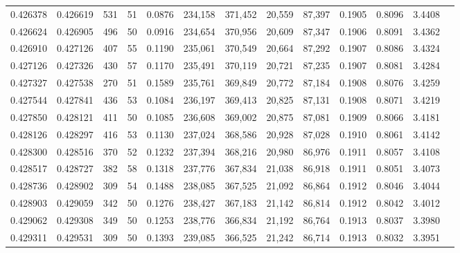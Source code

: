 \begin{tabular}{rrrrrrrrrrrrr}
0.426378 & 0.426619 &   531 &  51 &                                     0.0876 & 234,158 & 371,452 &  20,559 &  87,397 & 0.1905 & 0.8096 & 3.4408 \\
0.426624 & 0.426905 &   496 &  50 &                                     0.0916 & 234,654 & 370,956 &  20,609 &  87,347 & 0.1906 & 0.8091 & 3.4362 \\
0.426910 & 0.427126 &   407 &  55 &                                     0.1190 & 235,061 & 370,549 &  20,664 &  87,292 & 0.1907 & 0.8086 & 3.4324 \\
0.427126 & 0.427326 &   430 &  57 &                                     0.1170 & 235,491 & 370,119 &  20,721 &  87,235 & 0.1907 & 0.8081 & 3.4284 \\
0.427327 & 0.427538 &   270 &  51 &                                     0.1589 & 235,761 & 369,849 &  20,772 &  87,184 & 0.1908 & 0.8076 & 3.4259 \\
0.427544 & 0.427841 &   436 &  53 &                                     0.1084 & 236,197 & 369,413 &  20,825 &  87,131 & 0.1908 & 0.8071 & 3.4219 \\
0.427850 & 0.428121 &   411 &  50 &                                     0.1085 & 236,608 & 369,002 &  20,875 &  87,081 & 0.1909 & 0.8066 & 3.4181 \\
0.428126 & 0.428297 &   416 &  53 &                                     0.1130 & 237,024 & 368,586 &  20,928 &  87,028 & 0.1910 & 0.8061 & 3.4142 \\
0.428300 & 0.428516 &   370 &  52 &                                     0.1232 & 237,394 & 368,216 &  20,980 &  86,976 & 0.1911 & 0.8057 & 3.4108 \\
0.428517 & 0.428727 &   382 &  58 &                                     0.1318 & 237,776 & 367,834 &  21,038 &  86,918 & 0.1911 & 0.8051 & 3.4073 \\
0.428736 & 0.428902 &   309 &  54 &                                     0.1488 & 238,085 & 367,525 &  21,092 &  86,864 & 0.1912 & 0.8046 & 3.4044 \\
0.428903 & 0.429059 &   342 &  50 &                                     0.1276 & 238,427 & 367,183 &  21,142 &  86,814 & 0.1912 & 0.8042 & 3.4012 \\
0.429062 & 0.429308 &   349 &  50 &                                     0.1253 & 238,776 & 366,834 &  21,192 &  86,764 & 0.1913 & 0.8037 & 3.3980 \\
0.429311 & 0.429531 &   309 &  50 &                                     0.1393 & 239,085 & 366,525 &  21,242 &  86,714 & 0.1913 & 0.8032 & 3.3951 \\

\end{tabular}
